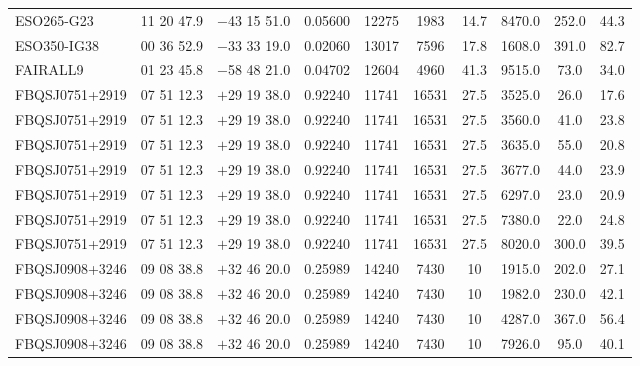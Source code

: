 \begin{landscape}
\begin{center}
\begin{longtable}{l c c c c c c c c c}
ESO265-G23  &              11 20 47.9  &         $-$43 15 51.0  &       0.05600  & 12275  &   1983  &       14.7  &      8470.0  &  252.0  &  44.3  \\
ESO350-IG38  &             00 36 52.9  &         $-$33 33 19.0  &       0.02060  & 13017  &   7596  &       17.8  &      1608.0  &  391.0  &  82.7  \\
FAIRALL9  &                01 23 45.8  &         $-$58 48 21.0  &       0.04702  & 12604  &   4960  &       41.3  &      9515.0  &  73.0  &   34.0  \\
FBQSJ0751+2919  &          07 51 12.3  &         $+$29 19 38.0  &       0.92240  & 11741  &   16531  &      27.5  &      3525.0  &  26.0  &   17.6  \\
FBQSJ0751+2919  &          07 51 12.3  &         $+$29 19 38.0  &       0.92240  & 11741  &   16531  &      27.5  &      3560.0  &  41.0  &   23.8  \\
FBQSJ0751+2919  &          07 51 12.3  &         $+$29 19 38.0  &       0.92240  & 11741  &   16531  &      27.5  &      3635.0  &  55.0  &   20.8  \\
FBQSJ0751+2919  &          07 51 12.3  &         $+$29 19 38.0  &       0.92240  & 11741  &   16531  &      27.5  &      3677.0  &  44.0  &   23.9  \\
FBQSJ0751+2919  &          07 51 12.3  &         $+$29 19 38.0  &       0.92240  & 11741  &   16531  &      27.5  &      6297.0  &  23.0  &   20.9  \\
FBQSJ0751+2919  &          07 51 12.3  &         $+$29 19 38.0  &       0.92240  & 11741  &   16531  &      27.5  &      7380.0  &  22.0  &   24.8  \\
FBQSJ0751+2919  &          07 51 12.3  &         $+$29 19 38.0  &       0.92240  & 11741  &   16531  &      27.5  &      8020.0  &  300.0  &  39.5  \\
FBQSJ0908+3246  &          09 08 38.8  &         $+$32 46 20.0  &       0.25989  & 14240  &   7430  &       10  &        1915.0  &  202.0  &  27.1  \\
FBQSJ0908+3246  &          09 08 38.8  &         $+$32 46 20.0  &       0.25989  & 14240  &   7430  &       10  &        1982.0  &  230.0  &  42.1  \\
FBQSJ0908+3246  &          09 08 38.8  &         $+$32 46 20.0  &       0.25989  & 14240  &   7430  &       10  &        4287.0  &  367.0  &  56.4  \\
FBQSJ0908+3246  &          09 08 38.8  &         $+$32 46 20.0  &       0.25989  & 14240  &   7430  &       10  &        7926.0  &  95.0  &   40.1  \\

\end{longtable}
\end{center}
\end{landscape}
